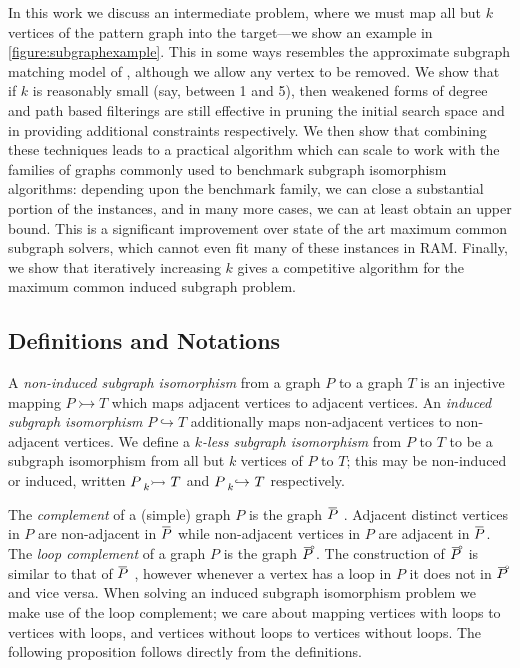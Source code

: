 \documentclass[letterpaper]{article}
\newcommand{\citet}[1]{\citeauthor{#1} \shortcite{#1}}
\theoremstyle{definition}
\newcommand{\shortoverline}[1]{\mkern 1.5mu\overline{\mkern-1.5mu#1\mkern-1.5mu}\mkern 1.5mu}
\newcommand{\lessnonind}[1]{\prescript{}{#1}{\rightarrowtail}\ }
\newcommand{\lessind}[1]{\prescript{}{#1}{\hookrightarrow}\ }
\newcommand{\loopcomp}[1]{\tset{\multimap}{#1}}
\newcommand{\tset}[2]{%
    \tikz[baseline=(X.base),inner sep=0pt,outer sep=0pt]{%
        \node[inner sep=0pt,outer sep=0pt] (X) {$#2$};
        \node[yshift=1.5pt,xshift=1pt] at (X.north) {$\scriptstyle#1$};
}}
\begin{document}
In this work we discuss an intermediate problem, where we must map all but $k$ vertices of the
pattern graph into the target---we show an example in \cref{figure:subgraphexample}. This in some
ways resembles the approximate subgraph matching model of \citet{DBLP:conf/cp/ZampelliDD05},
although we allow any vertex to be removed. We show that if
$k$ is reasonably small (say, between 1 and 5), then weakened forms of degree and path based
filterings are still effective in pruning the initial search space and in providing additional
constraints respectively. We then show that combining these techniques leads to a practical
algorithm which can scale to work with the families of graphs commonly used to benchmark subgraph
isomorphism algorithms: depending upon the benchmark family, we can close a substantial portion of
the instances, and in many more cases, we can at least obtain an upper bound. This is a significant
improvement over state of the art maximum common subgraph solvers, which cannot even fit many of
these instances in RAM. Finally, we show that iteratively increasing $k$ gives a competitive
algorithm for the maximum common induced subgraph problem.

\subsection{Definitions and Notations} \label{section:definitions}

A \emph{non-induced subgraph isomorphism} from a graph $P$ to a graph $T$ is an injective mapping $P
\rightarrowtail T $ which maps adjacent vertices to adjacent vertices. An \emph{induced subgraph
isomorphism} $P \hookrightarrow T$ additionally maps non-adjacent vertices to non-adjacent vertices.
We define a \emph{$k$-less subgraph isomorphism} from $P$ to $T$ to be a subgraph isomorphism from all but
$k$ vertices of $P$ to $T$; this may be non-induced or induced, written $P \lessnonind{k} T$ and $P
\lessind{k} T$ respectively.

The \emph{complement} of a (simple) graph $P$ is the graph $\shortoverline{P}~$.  Adjacent distinct
vertices in $P$ are non-adjacent in $\shortoverline{P}$ while non-adjacent vertices in $P$ are
adjacent in $\shortoverline{P}$.  The \emph{loop complement} of a graph $P$ is the graph
$\loopcomp{P}$.  The construction of $\loopcomp{P}$ is similar to that of $\shortoverline{P}~$, however
whenever a vertex has a loop in $P$ it does not in $\loopcomp{P}$ and vice versa.  When solving an
induced subgraph isomorphism problem we make use of the loop complement; we care about mapping
vertices with loops to vertices with loops, and vertices without loops to vertices without loops.
The following proposition follows directly from the definitions.
\end{document}
